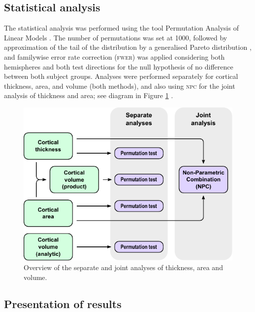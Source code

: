 \subsection{Statistical analysis}

The statistical analysis was performed using the tool Permutation Analysis of Linear Models \citep[\textsc{palm}; ][see also Section~\ref{sec:conclusion:palm}]{Winkler2014, Winkler2016_npc}. The number of permutations was set at 1000, followed by approximation of the tail of the distribution by a generalised Pareto distribution \citep[\textsc{gpd}; ][see also Chapter \ref{sec:accel}]{Winkler2016_fast}, and familywise error rate correction (\textsc{fwer}) was applied considering both hemispheres and both test directions for the null hypothesis of no difference between both subject groups. Analyses were performed separately for cortical thickness, area, and volume (both methods), and also using \textsc{npc} for the joint analysis of thickness and area; see diagram in Figure \ref{fig:flowstats}	.

\begin{figure}[!tp]
\begin{center}
\includegraphics{figures/flowstats.pdf}
\caption[Overview of the separate and joint analyses of thickness, area and volume.]{Overview of the separate and joint analyses of thickness, area and volume.}
\label{fig:flowstats}
\end{center}
\end{figure}

\subsection{Presentation of results}

